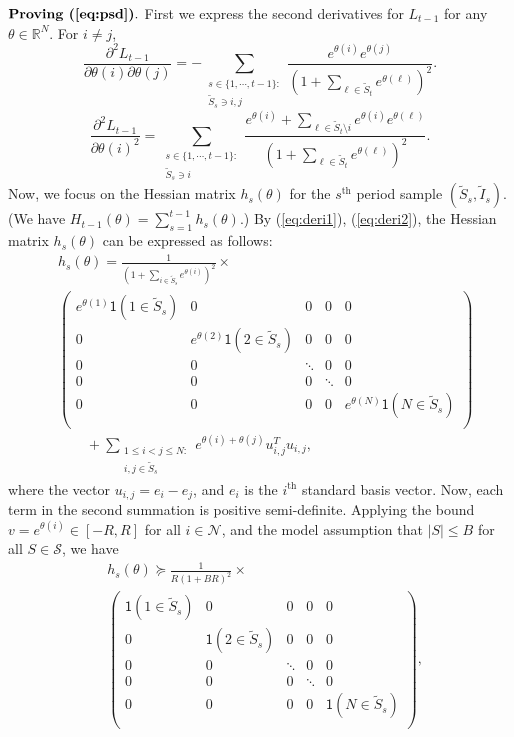 \documentclass{article}
\theoremstyle{definition}
\newcommand{\NNN}{\mathcal{N}}
\newcommand{\RRR}{\mathbb{R}}
\newcommand{\SSS}{\mathcal{S}}
\begin{document}
$\textbf{Proving (\ref{eq:psd})}.$ First we express the second derivatives for $L_{t-1}$ for any $\theta\in \RRR^N$. For $i\neq j$,
\begin{equation}\label{eq:deri1}
\frac{\partial^2 L_{t-1}}{\partial \theta(i)\partial\theta(j)} = -\sum_{\substack{s\in \{1, \cdots, t-1\}: \\ \tilde{S}_s \ni i,j }}\frac{e^{\theta(i)}e^{\theta(j)}}{\left(1 + \sum_{\ell\in \tilde{S}_t }e^{\theta(\ell)}\right)^2}.
\end{equation}
\begin{equation}\label{eq:deri2}
\frac{\partial^2 L_{t-1}}{\partial \theta(i)^2} = \sum_{\substack{s\in \{1, \cdots, t-1\}: \\ \tilde{S}_s \ni i}}\frac{e^{\theta(i)} + \sum_{\ell\in \tilde{S}_t\setminus i}e^{\theta(i)}e^{\theta(\ell)}}{\left(1 + \sum_{\ell\in \tilde{S}_t }e^{\theta(\ell)}\right)^2}.
\end{equation}
Now, we focus on the Hessian matrix $h_s(\theta)$ for the $s^\text{th}$ period sample $(\tilde{S}_s, \tilde{I}_s)$. (We have $H_{t-1}(\theta) = \sum^{t-1}_{s=1} h_s(\theta)$.) By (\ref{eq:deri1}), (\ref{eq:deri2}), the Hessian matrix $h_s(\theta)$ can be 
expressed as follows:
\begin{align*}%
&h_s(\theta) =  \frac{1}{(1 + \sum_{i\in \tilde{S}_s} e^{\theta(i)})^2} \times\nonumber\\
& \left( \begin{array}{ccccc}
e^{\theta(1)}\mathsf{1}(1\in \tilde{S}_s) & 0 & 0 & 0 & 0 \\
0 & e^{\theta(2)}\mathsf{1}(2\in \tilde{S}_s) & 0 & 0 & 0 \\
0 & 0 & \ddots &0 & 0 \\
0 &  0 & 0 & \ddots & 0 \\
0 & 0 & 0 & 0 & e^{\theta(N)}\mathsf{1}(N\in \tilde{S}_s) \\
\end{array} \right) \\
& \qquad + \sum_{\substack{1\leq i < j \leq N: \\ i, j\in \tilde{S}_s}}e^{\theta(i) + \theta(j)}u_{i,j}^T u_{i, j},
\end{align*}
where the vector $u_{i, j} = e_i - e_j$, and $e_i$ is the $i^\text{th}$ standard basis vector. Now, each term in the second summation is positive semi-definite. Applying the bound $v = e^{\theta(i)}\in [-R, R]$ for all $i\in \NNN$, and the model assumption that $|S|\leq B$ for all $S\in \SSS$, we have 
\begin{align}\label{eq:individualhessian}
& h_s(\theta) \succeq  \frac{1}{R(1 + B R)^2}\times \nonumber\\
&\left( \begin{array}{ccccc}
\mathsf{1}(1\in \tilde{S}_s) & 0 & 0 & 0 & 0 \\
0 & \mathsf{1}(2\in \tilde{S}_s) & 0 & 0 & 0 \\
0 & 0 & \ddots &0 & 0 \\
0 &  0 & 0 & \ddots & 0 \\
0 & 0 & 0 & 0 & \mathsf{1}(N\in \tilde{S}_s) \\
\end{array} \right),
\end{align}
\end{document}
